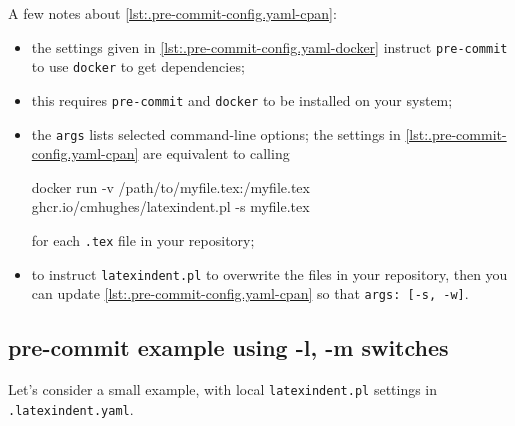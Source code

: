   A few notes about \cref{lst:.pre-commit-config.yaml-cpan}:
  \begin{itemize}
   \item the settings given in \cref{lst:.pre-commit-config.yaml-docker} instruct
         \texttt{pre-commit} to use \texttt{docker} to get dependencies;
   \item this requires \texttt{pre-commit} and \texttt{docker} to be installed on your
         system;
   \item the \texttt{args} lists selected command-line options; the settings in
         \cref{lst:.pre-commit-config.yaml-cpan} are equivalent to calling

         \begin{commandshell}
docker run -v /path/to/myfile.tex:/myfile.tex ghcr.io/cmhughes/latexindent.pl -s myfile.tex
\end{commandshell}

         for each \texttt{.tex} file in your repository;
   \item to instruct \texttt{latexindent.pl} to overwrite the files in your repository,
         then you can update \cref{lst:.pre-commit-config.yaml-cpan} so that
         \texttt{args: [-s, -w]}.
  \end{itemize}

 \subsection{pre-commit example using -l, -m switches}
  Let's consider a small example, with local \texttt{latexindent.pl} settings in
  \texttt{.latexindent.yaml}.

